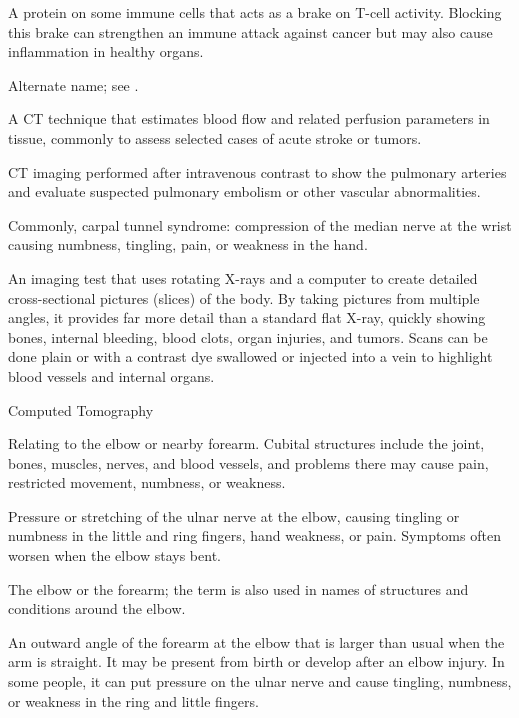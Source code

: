  A protein on some immune cells that acts as a brake on T-cell activity. Blocking this brake can strengthen an immune attack against cancer but may also cause inflammation in healthy organs.

 Alternate name; see .

 A CT technique that estimates blood flow and related perfusion parameters in tissue, commonly to assess selected cases of acute stroke or tumors.

 CT imaging performed after intravenous contrast to show the pulmonary arteries and evaluate suspected pulmonary embolism or other vascular abnormalities.

 Commonly, carpal tunnel syndrome: compression of the median nerve at the wrist causing numbness, tingling, pain, or weakness in the hand.

 An imaging test that uses rotating X-rays and a computer to create detailed cross-sectional pictures (slices) of the body. By taking pictures from multiple angles, it provides far more detail than a standard flat X-ray, quickly showing bones, internal bleeding, blood clots, organ injuries, and tumors. Scans can be done plain or with a contrast dye swallowed or injected into a vein to highlight blood vessels and internal organs.

\synonyms
Computed Tomography

 Relating to the elbow or nearby forearm. Cubital structures include the joint, bones, muscles, nerves, and blood vessels, and problems there may cause pain, restricted movement, numbness, or weakness.

 Pressure or stretching of the ulnar nerve at the elbow, causing tingling or numbness in the little and ring fingers, hand weakness, or pain. Symptoms often worsen when the elbow stays bent.

 The elbow or the forearm; the term is also used in names of structures and conditions around the elbow.

 An outward angle of the forearm at the elbow that is larger than usual when the arm is straight. It may be present from birth or develop after an elbow injury. In some people, it can put pressure on the ulnar nerve and cause tingling, numbness, or weakness in the ring and little fingers.

